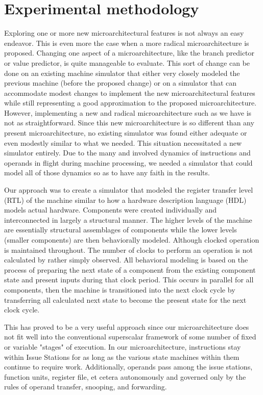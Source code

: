 \documentclass[10pt,dvips]{article}
\begin{document}
\section{Experimental methodology}
%
Exploring one or more new microarchitectural features is
not always an easy endeavor.  This is even more the case
when a more radical microarchitecture is proposed.
Changing one aspect of a microarchitecture, like
the branch predictor or value predictor, is quite manageable to
evaluate.  This sort of change can be done on an existing machine simulator
that either very closely modeled the previous machine (before the
proposed change) or on a simulator that can accommodate modest
changes to implement the new microarchitectural features
while still representing a good approximation to the proposed
microarchitecture.
However, implementing a new and radical microarchitecture
such as we have is not as straightforward.
Since this new microarchitecture is so different than any
present microarchitecture, no existing simulator was found
either adequate or even modestly similar to what we needed.
This situation necessitated a new simulator entirely.
Due to the many and involved dynamics of instructions and
operands in flight during machine processing, we needed a simulator
that could model all of those dynamics so as to have
any faith in the results.  

Our approach was to create a simulator
that modeled the register transfer level (RTL) of the machine
similar to how a hardware description language (HDL) models
actual hardware.  Components were created individually
and interconnected in largely a structural manner.
The higher levels of the machine are essentially structural
assemblages of components while the lower levels (smaller components)
are then behaviorally modeled.  Although clocked operation is
maintained throughout.
The number of clocks to perform an operation is not calculated
by rather simply observed.  All behavioral modeling is
based on the process of preparing the next state of a component
from the existing component state and present inputs during that
clock period.  This occurs in parallel for all components,
then the machine is transitioned into the next clock cycle by
transferring all calculated next state to become the present
state for the next clock cycle.

This has proved to be a very useful approach since our
microarchitecture does not fit well into the conventional
superscalar framework of some number of fixed or variable "stages"
of execution.  In our microarchitecture, instructions stay
within Issue Stations for as long as the various state machines
within them continue to require work.  Additionally, operands
pass among the issue stations, function units, register file, et
cetera autonomously and governed only by the rules of operand
transfer, snooping, and forwarding.
\end{document}
